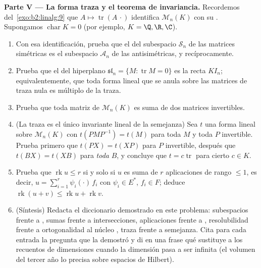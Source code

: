 \begin{problem}
\medskip
\noindent\textbf{Parte V --- La forma traza y el teorema de
invariancia.} Recordemos del~\cref{exo:b2:linalg:9} que $A \mapsto
\operatorname{tr}(A\,\cdot)$ identifica $\mathcal{M}_n(K)$ con su
. Supongamos $\operatorname{char} K = 0$ (por ejemplo, $K =
\Q, \R, \C$).
\begin{enumerate}[resume]
  \item Con esa identificación, prueba que el  del
        subespacio $\mathcal{S}_n$ de las matrices simétricas es el
        subespacio $\mathcal{A}_n$ de las antisimétricas, y
        recíprocamente.
  \item Prueba que el  del hiperplano $\mathfrak{sl}_n =
        \{M : \operatorname{tr} M = 0\}$ es la recta $K I_n$;
        equivalentemente, que toda forma lineal que se anula sobre
        las matrices de traza nula es múltiplo de la traza.
  \item Prueba que toda matriz de $\mathcal{M}_n(K)$ es suma de dos
        matrices invertibles.
  \item (La traza es el único invariante lineal de la semejanza)
        Sea $t$ una forma lineal sobre $\mathcal{M}_n(K)$ con
        $t(PMP^{-1}) = t(M)$ para toda $M$ y toda $P$ invertible.
        Prueba primero que $t(PX) = t(XP)$ para $P$ invertible,
        después que $t(BX) = t(XB)$ para \emph{toda} $B$, y
        concluye que $t = c \operatorname{tr}$ para cierto $c \in
        K$.
  \item Prueba que $\operatorname{rk} u \leq r$ si y solo si $u$ es
        suma de $r$ aplicaciones de rango $\leq 1$, es decir, $u =
        \sum_{i=1}^{r} \psi_i(\cdot)\,f_i$ con $\psi_i \in E^*$,
        $f_i \in F$; deduce $\operatorname{rk}(u + v) \leq
        \operatorname{rk} u + \operatorname{rk} v$.
  \item (Síntesis) Redacta el diccionario demostrado en este
        problema: subespacios frente a , sumas frente a
        intersecciones, aplicaciones frente a ,
        resolubilidad frente a ortogonalidad al núcleo ,
        traza frente a semejanza. Cita para cada entrada la
        pregunta que la demostró y di en una frase qué sustituye a
        los recuentos de dimensiones cuando la dimensión pasa a ser
        infinita (el volumen del tercer año lo precisa sobre
        espacios de Hilbert).
\end{enumerate}
\end{problem}
